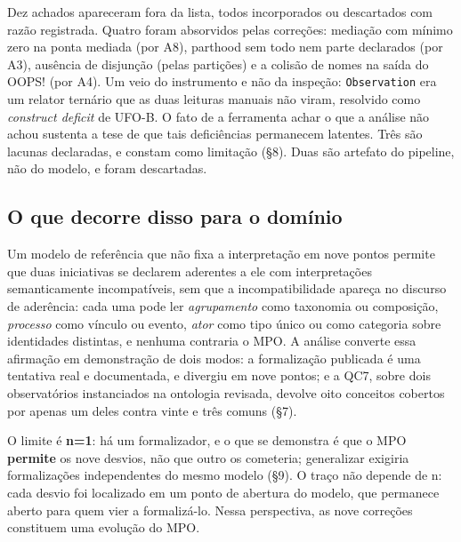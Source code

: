 Dez achados apareceram fora da lista, todos incorporados ou descartados com razão registrada. Quatro foram absorvidos pelas correções: mediação com mínimo zero na ponta mediada (por A8), parthood sem todo nem parte declarados (por A3), ausência de disjunção (pelas partições) e a colisão de nomes na saída do OOPS! (por A4). Um veio do instrumento e não da inspeção: \texttt{Observation} era um relator ternário que as duas leituras manuais não viram, resolvido como \textit{construct deficit} de UFO-B. O fato de a ferramenta achar o que a análise não achou sustenta a tese de que tais deficiências permanecem latentes. Três são lacunas declaradas, e constam como limitação (\S{}8). Duas são artefato do pipeline, não do modelo, e foram descartadas.

\subsection{O que decorre disso para o domínio}

Um modelo de referência que não fixa a interpretação em nove pontos permite que duas iniciativas se declarem aderentes a ele com interpretações semanticamente incompatíveis, sem que a incompatibilidade apareça no discurso de aderência: cada uma pode ler \textit{agrupamento} como taxonomia ou composição, \textit{processo} como vínculo ou evento, \textit{ator} como tipo único ou como categoria sobre identidades distintas, e nenhuma contraria o MPO. A análise converte essa afirmação em demonstração de dois modos: a formalização publicada é uma tentativa real e documentada, e divergiu em nove pontos; e a QC7, sobre dois observatórios instanciados na ontologia revisada, devolve oito conceitos cobertos por apenas um deles contra vinte e três comuns (\S{}7).

O limite é \textbf{n=1}: há um formalizador, e o que se demonstra é que o MPO \textbf{permite} os nove desvios, não que outro os cometeria; generalizar exigiria formalizações independentes do mesmo modelo (\S{}9). O traço não depende de n: cada desvio foi localizado em um ponto de abertura do modelo, que permanece aberto para quem vier a formalizá-lo. Nessa perspectiva, as nove correções constituem uma evolução do MPO.
